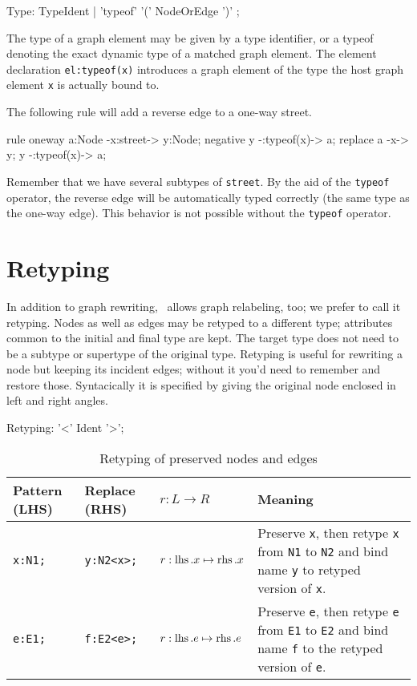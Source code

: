 \begin{rail}
  Type: TypeIdent | 'typeof' '(' NodeOrEdge ')' ;
\end{rail}
The type of a graph element may be given by a type identifier,
or a typeof denoting the exact dynamic type of a matched graph element.
The element declaration \texttt{el:typeof(x)} introduces a graph element of the type the host graph element \texttt{x} is actually bound to.
\begin{example}
The following rule will add a reverse edge to a one-way street.
\begin{grgen}
rule oneway {
    a:Node -x:street-> y:Node;
    negative {
        y -:typeof(x)-> a;
    }
    replace {
        a -x-> y;
        y -:typeof(x)-> a;
    }
}
\end{grgen}
Remember that we have several subtypes of \texttt{street}. By the aid of the \texttt{typeof} operator, the reverse edge will be automatically typed correctly (the same type as the one-way edge). This behavior is not possible without the \texttt{typeof} operator.
\end{example}


\section{Retyping} \label{sec:retype}
In addition to graph rewriting, \GrG\ allows graph relabeling\cite{Relabelling}, too; we prefer to call it retyping. 
Nodes as well as edges may be retyped to a different type; attributes common to the initial and final type are kept.
The target type does not need to be a subtype or supertype of the original type.
Retyping is useful for rewriting a node but keeping its incident edges; without it you'd need to remember and restore those.
Syntacically it is specified by giving the original node enclosed in left and right angles.
\begin{rail}
  Retyping: '<' Ident '>';
\end{rail}

\begin{table}[htbp]
\centering
\begin{tabularx}{\linewidth}{lllX}
  \textbf{Pattern (LHS)} & \textbf{Replace (RHS)} & \textbf{$r: L \longrightarrow R$} & \textbf{Meaning} \\ \hline 
  \texttt{x:N1;} & \texttt{y:N2<x>;}          & $r:\operatorname{lhs}.x \mapsto \operatorname{rhs}.x$ & Preserve \texttt{x}, then retype \texttt{x} from \texttt{N1} to \texttt{N2} and bind name \texttt{y} to retyped version of \texttt{x}.\\
  \texttt{e:E1;} & \texttt{f:E2<e>;}          & $r:\operatorname{lhs}.e \mapsto \operatorname{rhs}.e$ & Preserve \texttt{e}, then retype \texttt{e} from \texttt{E1} to \texttt{E2} and bind name \texttt{f} to the retyped version of \texttt{e}.\\
\end{tabularx}
\caption{Retyping of preserved nodes and edges}
\label{rule:retyping_graphlets}
\end{table}

